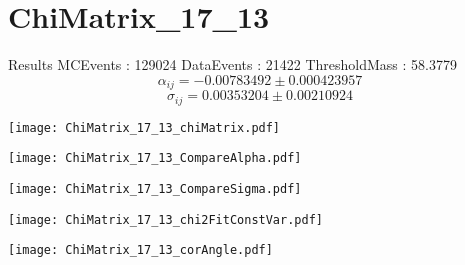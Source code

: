 \documentclass[a4paper,12pt]{article}
\begin{document}
\section{ChiMatrix\_17\_13}
\begin{minipage}{0.49\linewidth} Results \newline
MCEvents : 129024\newline
DataEvents : 21422 \newline
ThresholdMass : 58.3779\\
$$\alpha_{ij} = -0.00783492\pm 0.000423957$$
$$\sigma_{ij} = 0.00353204\pm 0.00210924$$
\end{minipage}\hfill
\begin{minipage}{0.49\linewidth} 
\texttt{[image: ChiMatrix\_17\_13\_chiMatrix.pdf]}\\
\end{minipage}
\hfill
\begin{minipage}{0.49\linewidth} 
\texttt{[image: ChiMatrix\_17\_13\_CompareAlpha.pdf]}\\
\end{minipage}
\hfill
\begin{minipage}{0.49\linewidth} 
\texttt{[image: ChiMatrix\_17\_13\_CompareSigma.pdf]}\\
\end{minipage}
\begin{minipage}{0.49\linewidth} 
\texttt{[image: ChiMatrix\_17\_13\_chi2FitConstVar.pdf]}\\
\end{minipage}
\hfill
\begin{minipage}{0.49\linewidth} 
\texttt{[image: ChiMatrix\_17\_13\_corAngle.pdf]}\\
\end{minipage}
\end{document}

